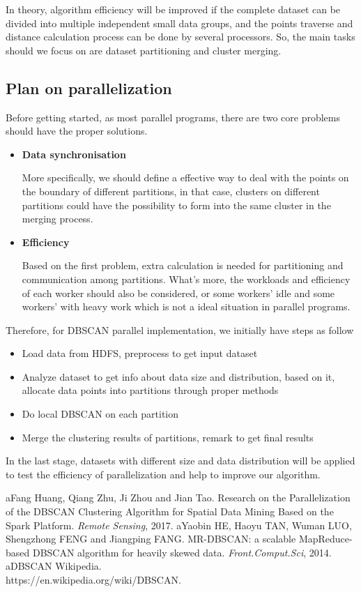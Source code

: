 \documentclass[letterpaper,twocolumn,10pt]{article}
\begin{document}
In theory, algorithm efficiency will be improved if the complete dataset can be divided into multiple independent small data groups, and the points traverse and distance calculation process can be done by several processors. So, the main tasks should we focus on are dataset partitioning and cluster merging.

\subsection{Plan on parallelization}
\quad Before getting started, as most parallel programs, there are two core problems should have the proper solutions.

\begin{itemize}
\item \textbf{Data synchronisation}

More specifically, we should define a effective way to deal with the points on the boundary of different partitions, in that case, clusters on different partitions could have the possibility to form into the same cluster in the merging process.
\item \textbf{Efficiency}

Based on the first problem, extra calculation is needed for partitioning and communication among partitions. What's more, the workloads and efficiency of each worker should also be considered, or some workers' idle and some workers' with heavy work which is not a ideal situation in parallel programs.
\end{itemize}

Therefore, for DBSCAN parallel implementation, we initially have steps as follow
\begin{itemize}
\item Load data from HDFS, preprocess to get input dataset
\item Analyze dataset to get info about data size and distribution, based on it, allocate data points into partitions through proper methods
\item Do local DBSCAN on each partition
\item Merge the clustering results of partitions, remark to get final results
\end{itemize}

In the last stage, datasets with different size and data distribution will be applied to test the efficiency of parallelization and help to improve our algorithm.

\begin{thebibliography}{1}
\bibitem[1]aFang Huang, Qiang Zhu, Ji Zhou and Jian Tao. Research on the Parallelization of the DBSCAN Clustering Algorithm for Spatial Data Mining Based on the Spark Platform. \textit{Remote Sensing}, 2017.
\bibitem[2]aYaobin HE, Haoyu TAN, Wuman LUO, Shengzhong FENG and Jiangping FANG. MR-DBSCAN: a scalable MapReduce-based DBSCAN algorithm for heavily skewed data. \textit{Front.Comput.Sci}, 2014.
\bibitem[3]aDBSCAN Wikipedia.\\ https://en.wikipedia.org/wiki/DBSCAN.
\end{thebibliography}
\end{document}

